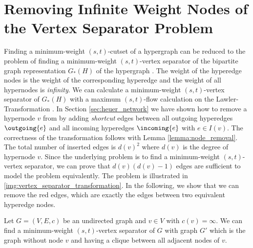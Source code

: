 \newpage
\section{Removing Infinite Weight Nodes of the Vertex Separator Problem}
\label{sec:infinite_weight_vertex_separator}

Finding a minimum-weight $(s,t)$-cutset of a hypergraph can be reduced to the problem 
of finding a minimum-weight $(s,t)$-vertex separator of the bipartite graph representation $G_*(H)$
of the hypergraph \cite{HuMoerder85,lawler1973}. The weight of the hyperedge nodes is the weight of the corresponding
hyperedge and the weight of all hypernodes is \emph{infinity}. We can calculate
a minimum-weight $(s,t)$-vertex separator of $G_*(H)$ with a maximum $(s,t)$-flow calculation 
on the Lawler-Transformation . In Section \ref{sec:heuer_network} 
we have shown how to remove a hypernode $v$ from  by adding 
\emph{shortcut} edges between all outgoing hyperedges $\outgoing{e}$ and all
incoming hyperedges $\incoming{e}$ with $e \in I(v)$. The correctness of the transformation
follows with Lemma \ref{lemma:node_removal}. The total number of inserted edges is
$d(v)^2$ where $d(v)$ is the degree of hypernode $v$. Since the underlying problem
is to find a minimum-weight $(s,t)$-vertex separator, we can prove that $d(v)(d(v)-1)$ edges
are sufficient to model the problem equivalently. The problem is illustrated in \autoref{img:vertex_separator_transformation}.
In the following, we show that we can remove the red edges, which are exactly the edges between
two equivalent hyperedge nodes. 

\begin{lemma}
\label{lemma:vertex_separator_lemma}
Let $G = (V,E,c)$ be an undirected graph and $v \in V$ with $c(v) = \infty$.
We can find a minimum-weight $(s,t)$-vertex separator of $G$
with graph $G'$ which is the graph without node $v$ and having a clique 
between all adjacent nodes of $v$.
\end{lemma}

